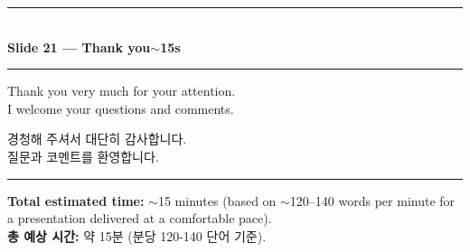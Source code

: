 \documentclass[10pt,a4paper]{article}
\newcommand{\sechead}[2]{%
  \vspace{6pt}%
  \noindent\rule{\linewidth}{0.6pt}\\[1pt]
  {\small\bfseries #1\hfill #2}\\[-3pt]
  \rule{\linewidth}{0.4pt}\par\vspace{2pt}%
}
\newcommand{\sent}[1]{#1\\[5pt]}
\newcommand{\bilingual}[2]{%
  \noindent%
  \begin{minipage}[t]{0.485\linewidth}
    \small #1
  \end{minipage}\hfill\vrule\hfill%
  \begin{minipage}[t]{0.483\linewidth}
    \small #2
  \end{minipage}\par\vspace{4pt}%
}
\begin{document}
\sechead{Slide 21 --- Thank you}{$\sim$15s}

\bilingual{%
\sent{Thank you very much for your attention.}
\sent{I welcome your questions and comments.}
}{%
\sent{경청해 주셔서 대단히 감사합니다.}
\sent{질문과 코멘트를 환영합니다.}
}

\vspace{10pt}

\noindent\rule{\linewidth}{0.5pt}

\vspace{6pt}

\begin{center}
\small
\textbf{Total estimated time:} $\sim$15 minutes (based on $\sim$120--140 words
per minute for a presentation delivered at a comfortable pace).\\[2pt]
\textbf{총 예상 시간:} 약 15분 (분당 120-140 단어 기준).
\end{center}
\end{document}
